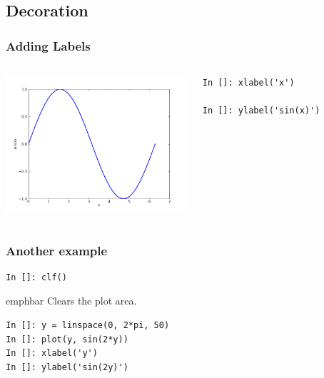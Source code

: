 \documentclass[14pt,compress]{beamer}
\newcommand{\emphbar}[1]
{\begin{beamercolorbox}[rounded=true]{emphbar}
      {#1}
 \end{beamercolorbox}
}
\newcommand{\typ}[1]{\lstinline{#1}}
\begin{document}
\subsection{Decoration}
\begin{frame}[fragile]
\frametitle{Adding Labels}
\begin{columns}
  \hspace*{-0.45in}
  \includegraphics[height=2in, interpolate=true]{data/label}
  \hspace*{0.5in}
  \begin{block}{}
  \small
  \begin{lstlisting}
In []: xlabel('x')

In []: ylabel('sin(x)')
  \end{lstlisting}
  \small

  \end{block}
\end{columns}
\end{frame}

\begin{frame}[fragile]
\frametitle{Another example}
  \begin{lstlisting}
In []: clf()
  \end{lstlisting}
\emphbar{Clears the plot area.}
  \begin{lstlisting}
In []: y = linspace(0, 2*pi, 50)
In []: plot(y, sin(2*y))
In []: xlabel('y')
In []: ylabel('sin(2y)')
  \end{lstlisting}
\end{frame}
\end{document}
